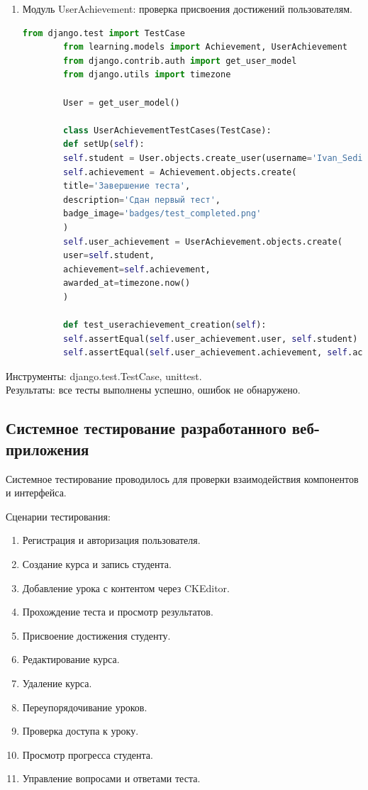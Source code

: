 \begin{enumerate}
	\item Модуль UserAchievement: проверка присвоения достижений пользователям.
	\begin{lstlisting}[language=Python, caption=Модульный тест для UserAchievement, label=lst:userachievement_test]
		from django.test import TestCase
		from learning.models import Achievement, UserAchievement
		from django.contrib.auth import get_user_model
		from django.utils import timezone
		
		User = get_user_model()
		
		class UserAchievementTestCases(TestCase):
		def setUp(self):
		self.student = User.objects.create_user(username='Ivan_Sedih', password='vanya232323', is_student=True)
		self.achievement = Achievement.objects.create(
		title='Завершение теста',
		description='Сдан первый тест',
		badge_image='badges/test_completed.png'
		)
		self.user_achievement = UserAchievement.objects.create(
		user=self.student,
		achievement=self.achievement,
		awarded_at=timezone.now()
		)
		
		def test_userachievement_creation(self):
		self.assertEqual(self.user_achievement.user, self.student)
		self.assertEqual(self.user_achievement.achievement, self.achievement)
	\end{lstlisting}
\end{enumerate}

Инструменты: django.test.TestCase, unittest.\\
Результаты: все тесты выполнены успешно, ошибок не обнаружено.


\subsection{Системное тестирование разработанного веб-приложения}

Системное тестирование проводилось для проверки взаимодействия компонентов и интерфейса.

Сценарии тестирования:
	\begin{enumerate}
	\item Регистрация и авторизация пользователя.
	\item Создание курса и запись студента.
	\item Добавление урока с контентом через CKEditor.
	\item Прохождение теста и просмотр результатов.
	\item Присвоение достижения студенту.
	\item Редактирование курса.
	\item Удаление курса.
	\item Переупорядочивание уроков.
	\item Проверка доступа к уроку.
	\item Просмотр прогресса студента.
	\item Управление вопросами и ответами теста.
	\end{enumerate}


